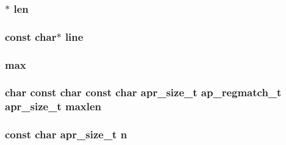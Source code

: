 \subsubsection[{\texorpdfstring{len}{len}}]{$\ast$ len}\hypertarget{group__APACHE__CORE__DAEMON_ga342def50f5e27714b3779c796673b996}{}\label{group__APACHE__CORE__DAEMON_ga342def50f5e27714b3779c796673b996}
\subsubsection[{\texorpdfstring{line}{line}}]{\setlength{\rightskip}{0pt plus 5cm}const char$\ast$ line}\hypertarget{group__APACHE__CORE__DAEMON_ga2a7a1aa13a4f14075411123a4495593c}{}\label{group__APACHE__CORE__DAEMON_ga2a7a1aa13a4f14075411123a4495593c}
\subsubsection[{\texorpdfstring{max}{max}}]{ max}\hypertarget{group__APACHE__CORE__DAEMON_gac1b9c6a7bfbd9ec2444735d634d4a557}{}\label{group__APACHE__CORE__DAEMON_gac1b9c6a7bfbd9ec2444735d634d4a557}
\subsubsection[{\texorpdfstring{maxlen}{maxlen}}]{\setlength{\rightskip}{0pt plus 5cm}char const char const char {\bf apr\+\_\+size\+\_\+t} {\bf ap\+\_\+regmatch\+\_\+t} {\bf apr\+\_\+size\+\_\+t} maxlen}\hypertarget{group__APACHE__CORE__DAEMON_ga396b50964961e17784202ccbefcbf25d}{}\label{group__APACHE__CORE__DAEMON_ga396b50964961e17784202ccbefcbf25d}
\subsubsection[{\texorpdfstring{n}{n}}]{\setlength{\rightskip}{0pt plus 5cm}const char {\bf apr\+\_\+size\+\_\+t} n}\hypertarget{group__APACHE__CORE__DAEMON_gabfc835ba1bb93aeecef9b949481c4a2d}{}\label{group__APACHE__CORE__DAEMON_gabfc835ba1bb93aeecef9b949481c4a2d}

